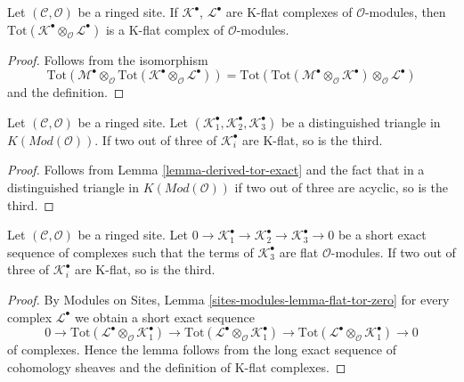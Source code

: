 \begin{lemma}
\label{lemma-tensor-product-K-flat}
Let $(\mathcal{C}, \mathcal{O})$ be a ringed site.
If $\mathcal{K}^\bullet$, $\mathcal{L}^\bullet$ are K-flat complexes
of $\mathcal{O}$-modules, then
$\text{Tot}(\mathcal{K}^\bullet \otimes_\mathcal{O} \mathcal{L}^\bullet)$
is a K-flat complex of $\mathcal{O}$-modules.
\end{lemma}

\begin{proof}
Follows from the isomorphism
$$
\text{Tot}(\mathcal{M}^\bullet \otimes_\mathcal{O}
\text{Tot}(\mathcal{K}^\bullet \otimes_\mathcal{O} \mathcal{L}^\bullet))
=
\text{Tot}(\text{Tot}(\mathcal{M}^\bullet \otimes_\mathcal{O}
\mathcal{K}^\bullet) \otimes_\mathcal{O} \mathcal{L}^\bullet)
$$
and the definition.
\end{proof}

\begin{lemma}
\label{lemma-K-flat-two-out-of-three}
Let $(\mathcal{C}, \mathcal{O})$ be a ringed site.
Let $(\mathcal{K}_1^\bullet, \mathcal{K}_2^\bullet, \mathcal{K}_3^\bullet)$
be a distinguished triangle in $K(\textit{Mod}(\mathcal{O}))$.
If two out of three of $\mathcal{K}_i^\bullet$ are K-flat, so is the third.
\end{lemma}

\begin{proof}
Follows from
Lemma \ref{lemma-derived-tor-exact}
and the fact that in a distinguished triangle in
$K(\textit{Mod}(\mathcal{O}))$
if two out of three are acyclic, so is the third.
\end{proof}

\begin{lemma}
\label{lemma-K-flat-two-out-of-three-ses}
Let $(\mathcal{C}, \mathcal{O})$ be a ringed site. Let
$0 \to \mathcal{K}_1^\bullet \to \mathcal{K}_2^\bullet \to
\mathcal{K}_3^\bullet \to 0$ be a short exact sequence of complexes
such that the terms of $\mathcal{K}_3^\bullet$ are flat $\mathcal{O}$-modules.
If two out of three of $\mathcal{K}_i^\bullet$ are K-flat, so is the third.
\end{lemma}

\begin{proof}
By Modules on Sites, Lemma \ref{sites-modules-lemma-flat-tor-zero}
for every complex $\mathcal{L}^\bullet$
we obtain a short exact sequence
$$
0 \to
\text{Tot}(\mathcal{L}^\bullet \otimes_\mathcal{O} \mathcal{K}_1^\bullet) \to
\text{Tot}(\mathcal{L}^\bullet \otimes_\mathcal{O} \mathcal{K}_1^\bullet) \to
\text{Tot}(\mathcal{L}^\bullet \otimes_\mathcal{O} \mathcal{K}_1^\bullet) \to 0
$$
of complexes. Hence the lemma follows from the long exact sequence of
cohomology sheaves and the definition of K-flat complexes.
\end{proof}

